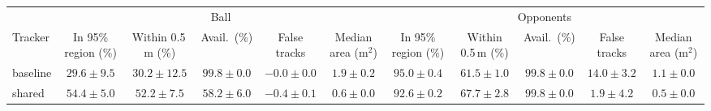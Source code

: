 \begin{tabular}{lcccccccccc}
\toprule
 & \multicolumn{5}{c}{Ball} & \multicolumn{5}{c}{Opponents} \\
\cmidrule(lr){2-6}\cmidrule(lr){7-11}
Tracker & In 95\% region (\%) & Within 0.5\,m (\%) & Avail.\ (\%) & False tracks & Median area (m$^2$) & In 95\% region (\%) & Within 0.5\,m (\%) & Avail.\ (\%) & False tracks & Median area (m$^2$) \\
\midrule
baseline & $29.6 \pm 9.5$ & $30.2 \pm 12.5$ & $99.8 \pm 0.0$ & $-0.0 \pm 0.0$ & $1.9 \pm 0.2$ & $95.0 \pm 0.4$ & $61.5 \pm 1.0$ & $99.8 \pm 0.0$ & $14.0 \pm 3.2$ & $1.1 \pm 0.0$ \\
shared & $54.4 \pm 5.0$ & $52.2 \pm 7.5$ & $58.2 \pm 6.0$ & $-0.4 \pm 0.1$ & $0.6 \pm 0.0$ & $92.6 \pm 0.2$ & $67.7 \pm 2.8$ & $99.8 \pm 0.0$ & $1.9 \pm 4.2$ & $0.5 \pm 0.0$ \\
\bottomrule
\end{tabular}
